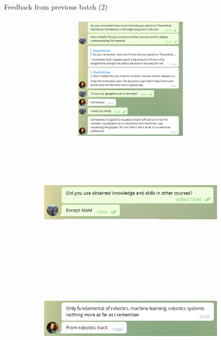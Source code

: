 \documentclass[aspectratio=169,xcolor=table,10pt, notes=hide]{beamer}
\begin{document}
\begin{frame}[t]{Feedback from previous batch (2)}
    \framesubtitle{}
    \begin{figure}[H]
        \begin{subfigure}[b]{0.49\textwidth}
            \centering\includegraphics[height=6cm,width=1\textwidth,keepaspectratio]{image22.png}
        \end{subfigure}
        \begin{subfigure}[b]{0.49\textwidth}
            \centering\includegraphics[height=6cm,width=1\textwidth,keepaspectratio]{image18.png}
            \centering\includegraphics[height=6cm,width=1\textwidth,keepaspectratio]{image20.png}
        \end{subfigure}
    \end{figure}
\end{frame}
\end{document}
